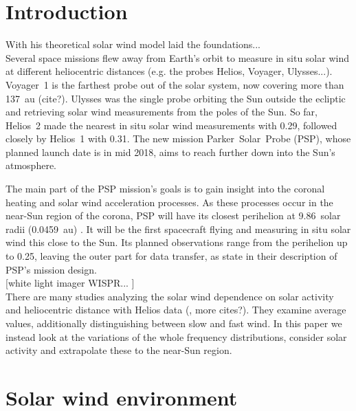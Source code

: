 \section{Introduction}

With his theoretical solar wind model \citet{Parker1958} laid the foundations...\\

Several space missions flew away from Earth's orbit to measure in situ solar wind at different heliocentric distances (e.g. the probes Helios, Voyager, Ulysses...). Voyager~1 is the farthest probe out of the solar system, now covering more than 137~au (cite?). Ulysses was the single probe orbiting the Sun outside the ecliptic and retrieving solar wind measurements from the poles of the Sun. So far, Helios~2 made the nearest in situ solar wind measurements with \SI{0.29}{\au}, followed closely by Helios~1 with \SI{0.31}{\au}. The new mission Parker~Solar~Probe (PSP), whose planned launch date is in mid 2018, aims to reach further down into the Sun's atmosphere.

The main part of the PSP mission's goals is to gain insight into the coronal heating and solar wind acceleration processes. As these processes occur in the near-Sun region of the corona, PSP will have its closest perihelion at 9.86~solar radii (0.0459~au) \citep{Fox2015}. It will be the first spacecraft flying and measuring in situ solar wind this close to the Sun. Its planned observations range from the perihelion up to \SI{0.25}{\au}, leaving the outer part for data transfer, as \citet{Fox2015} state in their description of PSP's mission design.\\

[white light imager WISPR... \citep{Vourlidas2016}]\\

There are many studies analyzing the solar wind dependence on solar activity and heliocentric distance with Helios data (\citet{Schwenn1983, Bougeret1984, Schwenn1990}, more cites?). They examine average values, additionally distinguishing between slow and fast wind. In this paper we instead look at the variations of the whole frequency distributions, consider solar activity and extrapolate these to the near-Sun region.\\


\section{Solar wind environment}

